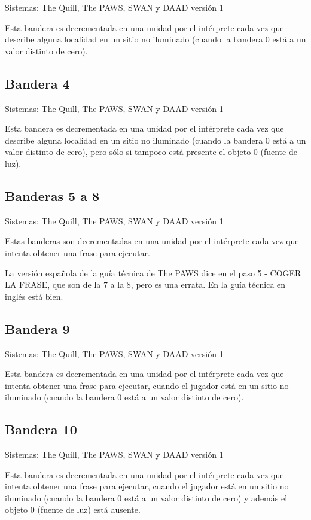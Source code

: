 \documentclass[11pt, a5paper]{article}
\newcommand{\quill}{\textsf{The Quill}\xspace}
\newcommand{\paw}{\textsf{The PAWS}\xspace}
\newcommand{\swan}{\textsf{SWAN}\xspace}
\newcommand{\daad}{\textsf{DAAD}\xspace}
\newcommand{\sistemas}[1]{\noindent Sistemas: #1 \nopagebreak}
\begin{document}
\sistemas{\quill, \paw, \swan y \daad versión 1}

Esta bandera es decrementada en una unidad por el intérprete cada vez que describe alguna localidad en un sitio no iluminado (cuando la bandera 0 está a un valor distinto de cero).

\subsection{Bandera 4}

\sistemas{\quill, \paw, \swan y \daad versión 1}

Esta bandera es decrementada en una unidad por el intérprete cada vez que describe alguna localidad en un sitio no iluminado (cuando la bandera 0 está a un valor distinto de cero), pero sólo si tampoco está presente el objeto 0 (fuente de luz).

\subsection{Banderas 5 a 8}

\sistemas{\quill, \paw, \swan y \daad versión 1}

Estas banderas son decrementadas en una unidad por el intérprete cada vez que intenta obtener una frase para ejecutar.

La versión española de la guía técnica de \paw dice en el paso 5 - COGER LA FRASE, que son de la 7 a la 8, pero es una errata. En la guía técnica en inglés \cite{PawsPC} está bien.

\subsection{Bandera 9}

\sistemas{\quill, \paw, \swan y \daad versión 1}

Esta bandera es decrementada en una unidad por el intérprete cada vez que intenta obtener una frase para ejecutar, cuando el jugador está en un sitio no iluminado (cuando la bandera 0 está a un valor distinto de cero).

\subsection{Bandera 10}

\sistemas{\quill, \paw, \swan y \daad versión 1}

Esta bandera es decrementada en una unidad por el intérprete cada vez que intenta obtener una frase para ejecutar, cuando el jugador está en un sitio no iluminado (cuando la bandera 0 está a un valor distinto de cero) y además el objeto 0 (fuente de luz) está ausente.
\end{document}
